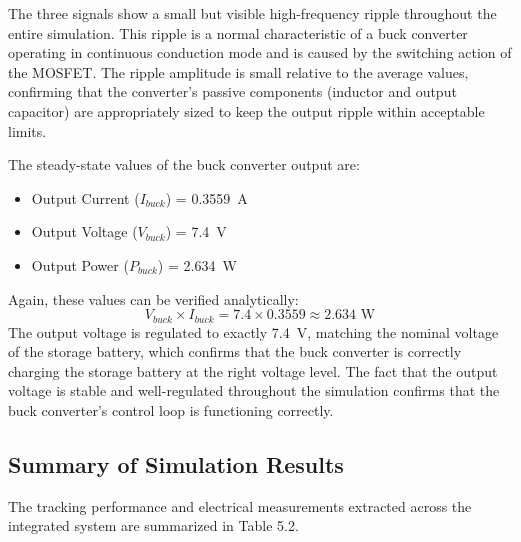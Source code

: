 The three signals show a small but visible high-frequency ripple throughout the entire simulation. This ripple is a normal characteristic of a buck converter operating in continuous conduction mode and is caused by the switching action of the MOSFET. The ripple amplitude is small relative to the average values, confirming that the converter's passive components (inductor and output capacitor) are appropriately sized to keep the output ripple within acceptable limits.

\pagebreak %

The steady-state values of the buck converter output are:
\begin{itemize}
    \item Output Current ($I_{buck}$) = 0.3559~A
    \item Output Voltage ($V_{buck}$) = 7.4~V
    \item Output Power ($P_{buck}$) = 2.634~W
\end{itemize}

Again, these values can be verified analytically:
\begin{equation}
    V_{buck} \times I_{buck} = 7.4 \times 0.3559 \approx 2.634\text{ W}
\end{equation}
The output voltage is regulated to exactly 7.4~V, matching the nominal voltage of the storage battery, which confirms that the buck converter is correctly charging the storage battery at the right voltage level. The fact that the output voltage is stable and well-regulated throughout the simulation confirms that the buck converter's control loop is functioning correctly.
\newpage
\subsection{Summary of Simulation Results}
The tracking performance and electrical measurements extracted across the integrated system are summarized in Table 5.2.

